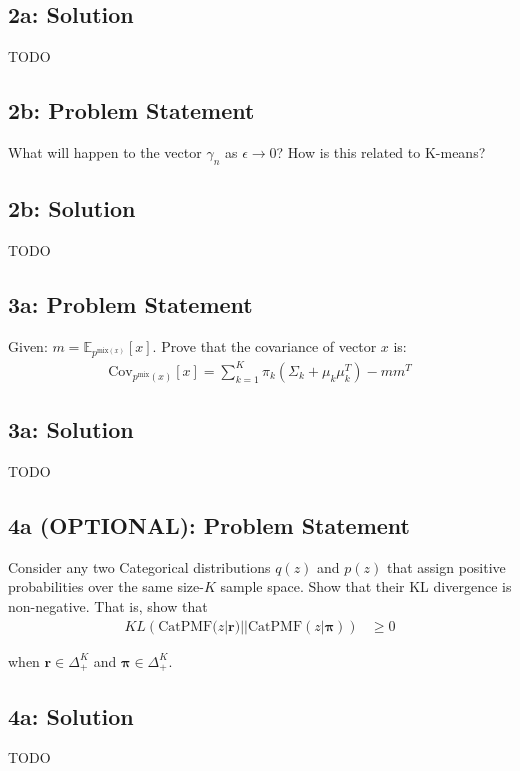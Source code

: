 \documentclass[10pt]{article}
\newcommand{\officialdirections}[1]{{\color{purple} #1}}
\begin{document}
\subsection{2a: Solution}
TODO

\officialdirections{
\subsection*{2b: Problem Statement}
What will happen to the vector $\gamma_n$ as $\epsilon \rightarrow 0$? How is this related to K-means?
}

\subsection{2b: Solution}

TODO

\newpage 
\officialdirections{
\subsection*{3a: Problem Statement}
Given: $m = \mathbb{E}_{p^{\text{mix}(x)}}[x]$.
Prove that the covariance of vector $x$ is:
\begin{align}
\text{Cov}_{p^{\text{mix}}(x)}[x] = \sum_{k=1}^K \pi_k (\Sigma_k + \mu_k \mu_k^T ) - m m^T
\end{align}
}
\subsection{3a: Solution}
TODO

\newpage
\officialdirections{
\subsection*{4a (OPTIONAL): Problem Statement}
Consider any two Categorical distributions $q(z)$ and $p(z)$ that assign positive probabilities over the same size-$K$ sample space. Show that their KL divergence is non-negative.  That is, show that
\begin{align}
KL\left( \text{CatPMF}(z | \mathbf{r}) || \text{CatPMF}(z | \mathbf{\pi}) \right) &\geq 0
\end{align}

when $\mathbf{r} \in \Delta^K_+$ and $\mathbf{\pi} \in \Delta^K_+$.

}

\subsection{4a: Solution}

TODO
\end{document}
